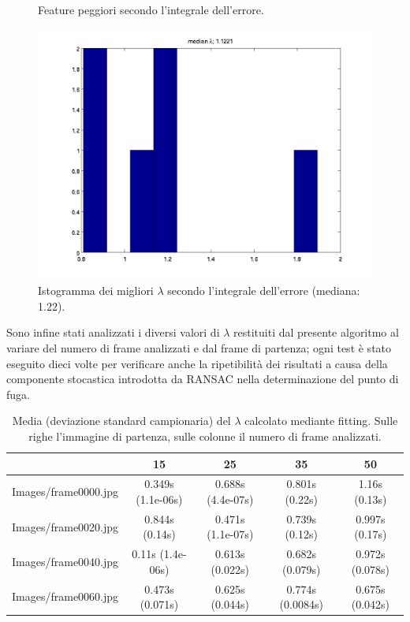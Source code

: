 \documentclass[12pt]{report}
\begin{document}
\begin{figure}[H]
\begin{minipage}[t]{0.5\linewidth}
\end{minipage}
\caption[short]{Feature peggiori secondo l'integrale dell'errore.}
\label{fig:worstIntErr}
\end{figure}


\begin{figure}[H]
	\centering
	\includegraphics[scale=.5]{images/intErrhistLamFit}
	\caption{Istogramma dei migliori $\lambda$ secondo l'integrale dell'errore (mediana: 1.22).}
	\label{fig:intErrHist}
\end{figure}

\noindent Sono infine stati analizzati i diversi valori di $\lambda$ restituiti dal presente algoritmo al variare del numero di frame analizzati e dal frame di partenza; ogni test \`e stato eseguito dieci volte per verificare anche la ripetibilit\`a dei risultati a causa della componente stocastica introdotta da RANSAC nella determinazione del punto di fuga.\\

\begin{table}[H]
\begin{center}
\begin{tabular}{|c|c|c|c|c|}
	\hline
	& 15 & 25 & 35 & 50 \\
	\hline
	Images/frame0000.jpg & 0.349s (1.1e-06s) & 0.688s (4.4e-07s) & 0.801s (0.22s) & 1.16s (0.13s)\\ \hline
	Images/frame0020.jpg & 0.844s (0.14s) & 0.471s (1.1e-07s) & 0.739s (0.12s) & 0.997s (0.17s)\\ \hline
	Images/frame0040.jpg & 0.11s (1.4e-06s) & 0.613s (0.022s) & 0.682s (0.079s) & 0.972s (0.078s)\\ \hline
	Images/frame0060.jpg & 0.473s (0.071s) & 0.625s (0.044s) & 0.774s (0.0084s) & 0.675s (0.042s)\\ \hline
\end{tabular}
\caption{Media (deviazione standard campionaria) del $\lambda$ calcolato mediante fitting. Sulle righe l'immagine di partenza, sulle colonne il numero di frame analizzati.}
\label{tabFit}
\end{center}
\end{table}
\end{document}
